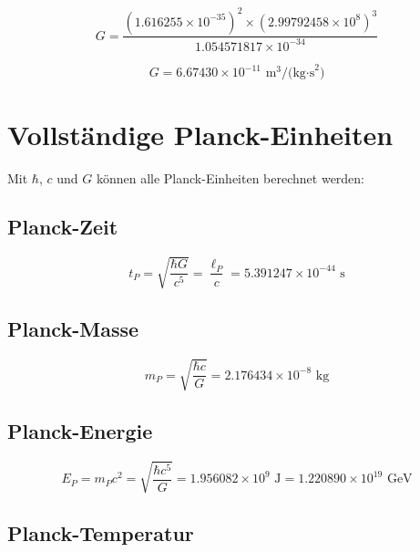 	\begin{equation}
		G = \frac{(1.616255 \times 10^{-35})^2 \times (2.99792458 \times 10^8)^3}{1.054571817 \times 10^{-34}}
	\end{equation}
	
	\begin{tcolorbox}[colback=green!5!white,colframe=green!75!black,title=Gravitationskonstante]
		\begin{equation}
			\boxed{G = 6.67430 \times 10^{-11} \text{ m}^3\text{/(kg·s}^2\text{)}}
		\end{equation}
	\end{tcolorbox}
	
	\section{Vollständige Planck-Einheiten}
	
	Mit $\hbar$, $c$ und $G$ können alle Planck-Einheiten berechnet werden:
	
	\subsection{Planck-Zeit}
	
	\begin{equation}
		t_P = \sqrt{\frac{\hbar G}{c^5}} = \frac{\ell_P}{c} = 5.391247 \times 10^{-44} \text{ s}
	\end{equation}
	
	\subsection{Planck-Masse}
	
	\begin{equation}
		m_P = \sqrt{\frac{\hbar c}{G}} = 2.176434 \times 10^{-8} \text{ kg}
	\end{equation}
	
	\subsection{Planck-Energie}
	
	\begin{equation}
		E_P = m_P c^2 = \sqrt{\frac{\hbar c^5}{G}} = 1.956082 \times 10^9 \text{ J} = 1.220890 \times 10^{19} \text{ GeV}
	\end{equation}
	
	\subsection{Planck-Temperatur}
	
